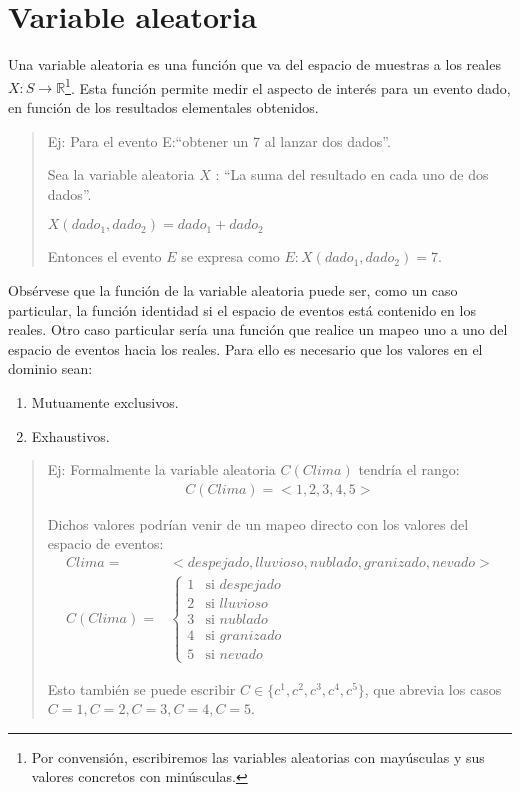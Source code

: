\section{Variable aleatoria}

Una variable aleatoria es una función que va del espacio de muestras a los reales $X : S \rightarrow \mathbb{R}$\footnote{Por convensión, escribiremos las variables aleatorias con mayúsculas y sus valores concretos con minúsculas.}.  Esta función permite medir el aspecto de interés para un evento dado, en función de los resultados elementales obtenidos. 
  \begin{quotation}
   Ej: Para el evento E:``obtener un 7 al lanzar dos dados''.
   
       Sea la variable aleatoria $X$ : ``La suma del resultado en cada uno de dos dados''.
   
       $X(dado_1, dado_2) = dado_1 + dado_2$
       
       Entonces el evento $E$ se expresa como $E : X(dado_1, dado_2) = 7$.
  \end{quotation}
Obsérvese que la función de la variable aleatoria puede ser, como un caso particular, la función identidad si el espacio de eventos está contenido en los reales.  Otro caso particular sería una función que realice un mapeo uno a uno del espacio de eventos hacia los reales.  Para ello es necesario que los valores en el dominio sean:
 \begin{enumerate}
  \item Mutuamente exclusivos.
  \item Exhaustivos.
 \end{enumerate}

 \begin{quotation}
  Ej: Formalmente la variable aleatoria $C(Clima)$ tendría el rango:
  \begin{align*}
   C(Clima) = <1, 2, 3, 4, 5>
  \end{align*}
 
  Dichos valores podrían venir de un mapeo directo con los valores del espacio de eventos:
   \begin{align*}
    Clima =& <despejado, lluvioso, nublado, granizado, nevado> \\
    C(Clima) =& \begin{cases}
		1	& \text{si } despejado \\
		2       & \text{si } lluvioso \\
		3	& \text{si } nublado \\
		4	& \text{si } granizado \\
		5	& \text{si } nevado
	      \end{cases}
   \end{align*}
   
   Esto también se puede escribir $C \in \{c^1,c^2,c^3,c^4,c^5\}$, que abrevia los casos $C=1,C=2,C=3,C=4,C=5$.
 \end{quotation}

